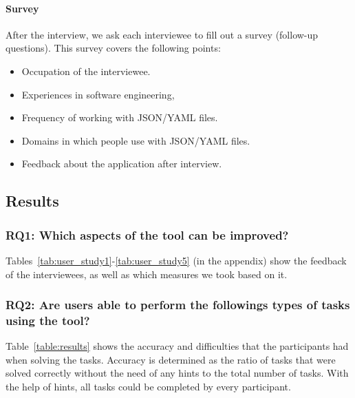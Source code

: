 \paragraph{Survey}
After the interview, we ask each interviewee to fill out a survey (follow-up questions).
This survey covers the following points:
\begin{itemize}
    \item Occupation of the interviewee.
    \item Experiences in software engineering,
    \item Frequency of working with JSON/YAML files.
    \item Domains in which people use with JSON/YAML files.
    \item Feedback about the application after interview.
\end{itemize}

\subsection{Results}\label{subsec:results}


\subsubsection{\textbf{RQ1:} Which aspects of the tool can be improved?} %
Tables~\ref{tab:user_study1}-\ref{tab:user_study5} (in the appendix) show the feedback of the interviewees, as well as which measures we took based on it.



\subsubsection{\textbf{RQ2:} Are users able to perform the followings types of tasks using the tool?}
Table~\ref{table:results} shows the accuracy and difficulties that the participants had when solving the tasks.
Accuracy is determined as the ratio of tasks that were solved correctly without the need of any hints to the total number of tasks.
With the help of hints, all tasks could be completed by every participant.

